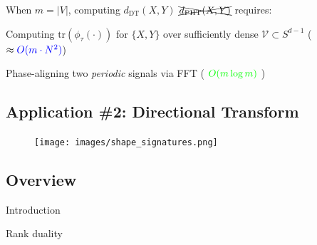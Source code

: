 \documentclass[
  letterpaper,
  DIV=11,
  numbers=noendperiod,
  oneside]{scrartcl}
\begin{document}
\begin{figure}

\begin{minipage}[t]{0.30\linewidth}

{\centering 


}

\end{minipage}%
%
\begin{minipage}[t]{0.70\linewidth}

{\centering 


}

\end{minipage}%

\end{figure}

When \(m = \lvert V \rvert\), computing \(d_{\mathrm{DT}}(X, Y)\)
\(\xcancel{d_{\mathrm{PHT}}(X, Y)}\) requires:

Computing \(\mathrm{tr}(\phi_\tau(\cdot))\) for \(\{X,Y\}\) over
sufficiently dense \(\mathcal{V} \subset S^{d-1}\)
(\(\approx {\color{blue} O(m \cdot N^2)}\))

Phase-aligning two \emph{periodic} signals via FFT (
\({\color{green} O(m \log m)}\) )

\subsection{Application \#2: Directional
Transform}\label{application-2-directional-transform-4}

\begin{figure}

{\centering \texttt{[image: images/shape\_signatures.png]}

}

\end{figure}

\subsection{Overview}\label{overview-1}

Introduction

Rank duality
\end{document}
